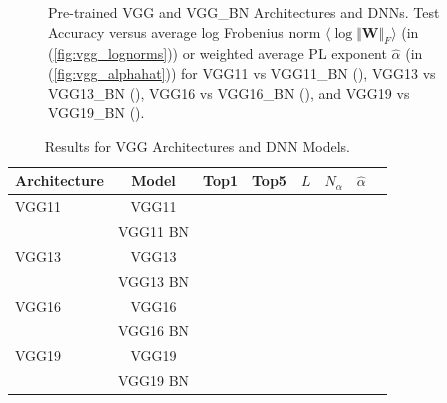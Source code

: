 \begin{figure}[t]
{      \label{fig:vgg_alphahat}
   }
   \caption{%
      Pre-trained VGG and VGG\_BN Architectures and DNNs.  
      Test Accuracy versus
      average log Frobenius norm $\langle\log\Vert\mathbf{W}\Vert_{F}\rangle$ (in (\ref{fig:vgg_lognorms}))
      or
      weighted average PL exponent $\hat{\alpha}$ (in (\ref{fig:vgg_alphahat}))
      for
      VGG11 vs VGG11\_BN ({\color{blue}{blue}}),
      VGG13 vs VGG13\_BN ({\color{orange}{orange}}),
      VGG16 vs VGG16\_BN ({\color{green}{green}}),  and
      VGG19 vs VGG19\_BN ({\color{red}{red}}). 
   }
   \label{fig:vgg}
\end{figure}





\begin{table}[t]
\small
\begin{center}
\begin{tabular}{|p{0.75in}|c|c|c|c|c|c|c|}
\hline
Architecture 
 & Model &Top1 
 & Top5 & $L$ & $N_{\alpha}$ & $\hat{\alpha}$ \\
\hline
VGG11 & VGG11 & & & & & \\
  & VGG11 BN & & & & & \\
\hline
VGG13 & VGG13 & & & & & \\
  & VGG13 BN & & & & & \\
\hline
VGG16 & VGG16 & & & & & \\
  & VGG16 BN & & & & & \\
\hline
VGG19 & VGG19 & & & & & \\
  & VGG19 BN & & & & & \\
\hline
\end{tabular}
\end{center}
\caption{Results for VGG Architectures and DNN Models.}
\label{table:models_VGG}
\end{table}



